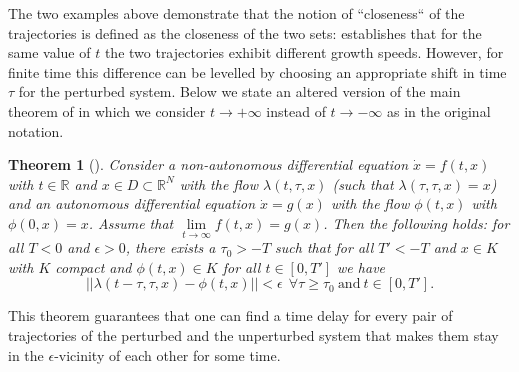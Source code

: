 \documentclass{article}
\newtheorem{theorem}{Theorem}[section]
\newtheorem{rmk}{Remark}[section]
\newcommand{\md}[1]{{\color{red}Hong:  #1}}
\newcommand{\nb}[1]{{\color{purple}Natasha:  #1}}
\begin{document}

The two examples above demonstrate that  the notion of ``closeness`` of the trajectories is defined as the closeness of the two sets: \cite{rasmussen2008bifurcations} establishes that for the same value of $t$ the two trajectories exhibit  different growth speeds. However, for finite time this difference can be levelled by choosing an appropriate shift in time $\tau$ for the perturbed system. Below we state an  altered version of the main theorem of \cite{rasmussen2008bifurcations} in which we consider $t\rightarrow +\infty$ instead of $t\to-\infty$ as in the original notation.
\begin{theorem}[\cite{rasmussen2008bifurcations}]

  Consider a non-autonomous differential equation $\dot{x} = f(t,x)$ with $t\in \mathbb{R}$  and $x\in D\subset \mathbb{R}^N$ with the flow $\lambda(t,\tau,x)$ (such that $
    \lambda(\tau,\tau,x)=x$) and an autonomous differential equation $\dot{x} = g(x)$ with the flow $\phi(t,x)$ with $\phi(0,x) = x$.  Assume that $\lim\limits_{t\to\infty}f(t,x) = g(x)$. Then the following holds: for all $T<0$ and $\epsilon>0$, there exists a $\tau_0>-T$ such that for all $T'<-T$ and $x\in K$ with $K$ compact and $\phi(t,x)\in K$ for all $t\in[0,T']$ we have
    \[
    ||\lambda(t - \tau, \tau,x) - \phi(t,x)||<\epsilon \ \ \forall \tau\ge \tau_0 \ \text{and} \ t\in[0,T'].
    \]
    
\end{theorem}
This theorem guarantees that one can find a time delay for every pair of trajectories of the perturbed and the unperturbed system that makes them stay in the $\epsilon$-vicinity of each other for some time. 
\end{document}

